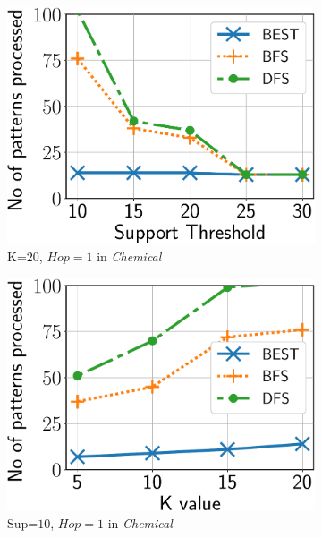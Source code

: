\begin{figure}
	\begin{subfigure}[b]{0.25\textwidth}
		\includegraphics[keepaspectratio,scale=0.24, angle=0]{img2/chemical/chemical_bfsdfs_pop.pdf}
		\caption{\scriptsize {\sf K}=$20$, $Hop=1$ in {\em Chemical}}
		\label{fig:chemical_bfsdfs_pop}
	\end{subfigure}%
	\begin{subfigure}[b]{0.25\textwidth}
		\includegraphics[keepaspectratio,scale=0.24, angle=0]{img2/chemical/chemical_bfsdfs_pop_k.pdf}
		\caption{\scriptsize{\sf Sup}=$10$, $Hop=1$ in {\em Chemical}}
		\label{fig:chemical_bfsdfs_pop_k}
	\end{subfigure}
	\begin{subfigure}[b]{0.25\textwidth}

\end{subfigure}
\end{figure}
